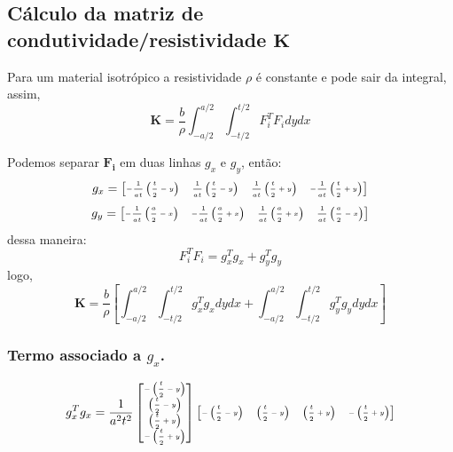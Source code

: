 \documentclass[
12pt,
a4paper,
oneside,
chapter=TITLE,
sumario=tradicional
]{abntex2}
\begin{document}
 \subsection{Cálculo da matriz de condutividade/resistividade $\mathbf{K}$}
 
 Para um material isotrópico a resistividade $\rho$ é constante e pode sair da integral, assim, 
 $$  
 \mathbf{K} = \frac{b}{\rho} \int_{-a/2}^{a/2} \int_{-t/2}^{t/2} F_i^T F_i  dy dx  
 $$
 
 Podemos separar $\mathbf{F_i}$ em duas linhas $g_x$ e $g_y$, então:
 $$ \tiny 
 g_x =  
 \begin{bmatrix}  
 	-\dfrac{1}{at}\left(\dfrac{t}{2} - y\right) &  
 	\dfrac{1}{at}\left(\dfrac{t}{2} - y\right) &  
 	\dfrac{1}{at}\left(\dfrac{t}{2} + y\right) &  
 	-\dfrac{1}{at}\left(\dfrac{t}{2} + y\right)  
 \end{bmatrix}  
 $$
 $$ \tiny  
 g_y =  
 \begin{bmatrix}  
 	-\dfrac{1}{at}\left(\dfrac{a}{2} - x\right) &  
 	-\dfrac{1}{at}\left(\dfrac{a}{2} + x\right) &  
 	\dfrac{1}{at}\left(\dfrac{a}{2} + x\right) &  
 	\dfrac{1}{at}\left(\dfrac{a}{2} - x\right)  
 \end{bmatrix}  
 $$
 dessa maneira:
 $$  
 F_i^T F_i = g_x^T g_x + g_y^T g_y  
 $$
 logo,
 \begin{equation} 
  \mathbf{K} = \frac{b}{\rho}  
 \left[\int_{-a/2}^{a/2} \int_{-t/2}^{t/2} g_x^T g_x  dydx  
 +  
 \int_{-a/2}^{a/2} \int_{-t/2}^{t/2} g_y^T g_y  dydx \right] 
 \label{eq:MEF_eq_0037}
 \end{equation}
 
 \subsubsection{Termo associado a $g_x$. }
 $$ \tiny  
 g_x^T g_x = \frac{1}{a^2 t^2}  
 \begin{bmatrix}  
 	-\left(\dfrac{t}{2} - y\right) \\  
 	\left(\dfrac{t}{2} - y\right) \\  
 	\left(\dfrac{t}{2} + y\right) \\  
 	-\left(\dfrac{t}{2} + y\right)  
 \end{bmatrix}  
 \begin{bmatrix}  
 	-\left(\dfrac{t}{2} - y\right) &  
 	\left(\dfrac{t}{2} - y\right) &  
 	\left(\dfrac{t}{2} + y\right) &  
 	-\left(\dfrac{t}{2} + y\right)  
 \end{bmatrix}  
 $$
 
\end{document}
